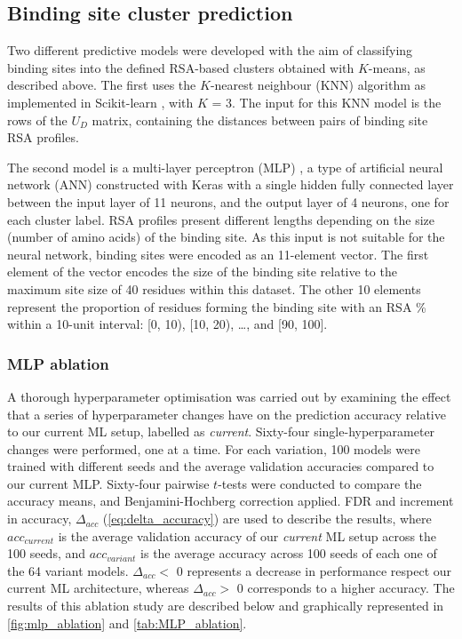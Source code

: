 \subsection{Binding site cluster prediction}

Two different predictive models were developed with the aim of classifying binding sites into the defined RSA-based clusters obtained with $K$-means, as described above. The first  uses the $K$-nearest neighbour (KNN) algorithm as implemented in Scikit-learn \cite{PEDREGOSA_2011_SKLEARN}, with $K$ = 3. The input for this KNN model is the rows of the $U_{D}$ matrix, containing the distances between pairs of binding site RSA profiles.

The second model is a multi-layer perceptron (MLP) \cite{CYBENKO_1989_MLP}, a type of artificial neural network (ANN) constructed with Keras \cite{CHOLLET_2015_KERAS} with a single hidden fully connected layer between the input layer of 11 neurons, and the output layer of 4 neurons, one for each cluster label. RSA profiles present different lengths depending on the size (number of amino acids) of the binding site. As this input is not suitable for the neural network, binding sites were encoded as an 11-element vector. The first element of the vector encodes the size of the binding site relative to the maximum site size of 40 residues within this dataset. The other 10 elements represent the proportion of residues forming the binding site with an RSA \% within a 10-unit interval: [0, 10), [10, 20), …, and [90, 100].

\subsubsection{MLP ablation}

A thorough hyperparameter optimisation was carried out by examining the effect that a series of hyperparameter changes have on the prediction accuracy relative to our current ML setup, labelled as \textit{current}. Sixty-four single-hyperparameter changes were performed, one at a time. For each variation, 100 models were trained with different seeds and the average validation accuracies compared to our current MLP. Sixty-four pairwise $t$-tests were conducted to compare the accuracy means, and Benjamini-Hochberg correction \cite{BENJAMINI_1995_FDR} applied. FDR and increment in accuracy, $\Delta_{acc}$ (\autoref{eq:delta_accuracy}) are used to describe the results, where $acc_{current}$ is the average validation accuracy of our \textit{current} ML setup across the 100 seeds, and $acc_{variant}$ is the average accuracy across 100 seeds of each one of the 64 variant models. $\Delta_{acc} <$ 0 represents a decrease in performance respect our current ML architecture, whereas $\Delta_{acc} >$ 0 corresponds to a higher accuracy. The results of this ablation study are described below and graphically represented in \autoref{fig:mlp_ablation} and \autoref{tab:MLP_ablation}.

